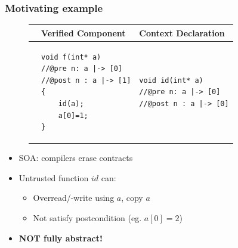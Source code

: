 \documentclass{beamer}
\begin{document}
\begin{frame}[fragile]
\frametitle{Motivating example}
\begin{figure}[ht]
\begin{tabular}{c|M{.4\textwidth}|M{.4\textwidth}}
& \textbf{Verified Component}  & \textbf{Context Declaration} \\
\hline%
&
{\begin{lstlisting}[style=CStyle,numbers=none,belowskip=-1em]
void f(int* a)
//@pre n: a |-> [0]  
//@post n : a |-> [1]
{
	id(a); 
	a[0]=1;
}
\end{lstlisting}}
&
{\begin{lstlisting}[style=CStyle,numbers=none,belowskip=-1em]
void id(int* a)
//@pre n: a |-> [0]  
//@post n : a |-> [0]
\end{lstlisting}}\\
\end{tabular} 
\label{trivialexample}
\end{figure} %
\begin{itemize}
\item SOA: compilers erase contracts
\item Untrusted function $id$ can:
	\begin{itemize}
	\item Overread/-write using $a$, copy $a$
	\item Not satisfy postcondition (eg. $a[0] =2$)
	\end{itemize}
\item \textbf{NOT fully abstract!} %
\end{itemize}
\end{frame}

\end{document}
